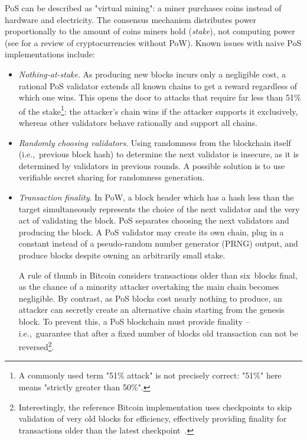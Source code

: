 PoS can be described as "virtual mining": a miner purchases coins instead of hardware and electricity.
The consensus mechanism distributes power proportionally to the amount of coins miners hold (\textit{stake}), not computing power (see \cite{Bentov2016} for a review of cryptocurrencies without PoW).
Known issues with naive PoS implementations include:

\begin{itemize}
	\item \emph{Nothing-at-stake}.
	As producing new blocks incurs only a negligible cost, a rational PoS validator extends all known chains to get a reward regardless of which one wins.
	This opens the door to attacks that require far less than 51\% of the stake\footnote{A commonly used term "51\% attack" is not precisely correct: "51\%" here means "strictly greater than 50\%".}: the attacker's chain wins if the attacker supports it exclusively, whereas other validators behave rationally and support all chains.
	\item \emph{Randomly choosing validators}.
	Using randomness from the blockchain itself (i.e.,~previous block hash) to determine the next validator is insecure, as it is determined by validators in previous rounds.
	A possible solution is to use verifiable secret sharing for randomness generation.
	\item \emph{Transaction finality}.
	In PoW, a block header which has a hash less than the target simultaneously represents the choice of the next validator and the very act of validating the block.
	PoS separates choosing the next validators and producing the block.
	A PoS validator may create its own chain, plug in a constant instead of a pseudo-random number generator (PRNG) output, and produce blocks despite owning an arbitrarily small stake.
	
	A rule of thumb in Bitcoin considers transactions older than six~blocks final, as the chance of a minority attacker overtaking the main chain becomes negligible.
	By contrast, as PoS blocks cost nearly nothing to produce, an attacker can secretly create an alternative chain starting from the genesis block.
	To prevent this, a PoS blockchain must provide finality -- i.e.,~guarantee that after a fixed number of blocks old transaction can not be reversed\footnote{Interestingly, the reference Bitcoin implementation uses checkpoints to skip validation of very old blocks for efficiency, effectively providing finality for transactions older than the latest checkpoint~\cite{BitcoinCheckpoints}.}.
\end{itemize}

